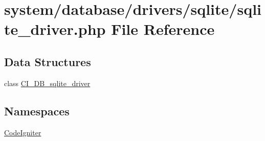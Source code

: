 \hypertarget{sqlite__driver_8php}{}\section{system/database/drivers/sqlite/sqlite\+\_\+driver.php File Reference}
\label{sqlite__driver_8php}
\subsection*{Data Structures}
\begin{DoxyCompactItemize}
\item 
class \mbox{\hyperlink{class_c_i___d_b__sqlite__driver}{C\+I\+\_\+\+D\+B\+\_\+sqlite\+\_\+driver}}
\end{DoxyCompactItemize}
\subsection*{Namespaces}
\begin{DoxyCompactItemize}
\item 
 \mbox{\hyperlink{namespace_code_igniter}{Code\+Igniter}}
\end{DoxyCompactItemize}
